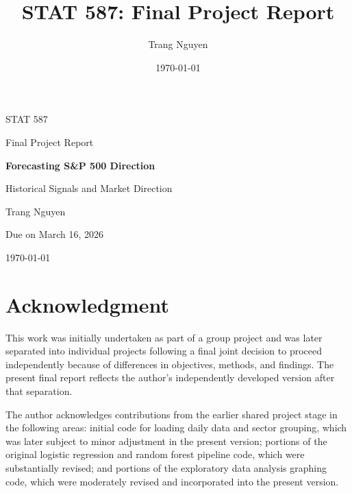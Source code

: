 \documentclass[11pt]{article}
\title{STAT 587: Final Project Report\\[0.5em]}
\author{Trang Nguyen}
\date{\today}
\begin{document}
\begin{titlepage}
    \centering
    \vspace*{1.5cm}
    
    {\Large STAT 587 \par}
    \vspace{0.3cm}
    {\large Final Project Report \par}
    
    \vspace{2cm}
    
    {\LARGE\bfseries Forecasting S\&P 500 Direction \par}
    \vspace{0.4cm}
    {\Large Historical Signals and Market Direction \par}
    
    \vspace{1.8cm}
    
  
    \vspace{1cm}
    
    {\large Trang Nguyen \par}
    
    
    \vfill
    
    {\large Due on March 16, 2026 \par}
    \vspace{0.3cm}
    {\large \today \par}
\end{titlepage}

\setcounter{page}{1}

\section*{Acknowledgment}

This work was initially undertaken as part of a group project and was later separated into individual projects following a final joint decision to proceed independently because of differences in objectives, methods, and findings. The present final report reflects the author's independently developed version after that separation.

The author acknowledges contributions from the earlier shared project stage in the following areas: initial code for loading daily data and sector grouping, which was later subject to minor adjustment in the present version; portions of the original logistic regression and random forest pipeline code, which were substantially revised; and portions of the exploratory data analysis graphing code, which were moderately revised and incorporated into the present version.
\end{document}
